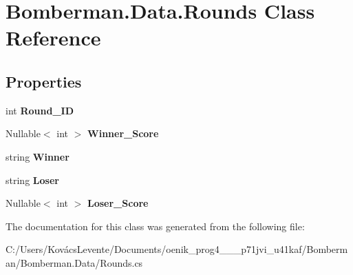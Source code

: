 \hypertarget{class_bomberman_1_1_data_1_1_rounds}{}\section{Bomberman.\+Data.\+Rounds Class Reference}
\label{class_bomberman_1_1_data_1_1_rounds}
\subsection*{Properties}
\begin{DoxyCompactItemize}
\item 
\mbox{\label{class_bomberman_1_1_data_1_1_rounds_a990418ceaf10b99f4545bc3ba2635e8f}} 
int {\bfseries Round\+\_\+\+ID}
\item 
\mbox{\label{class_bomberman_1_1_data_1_1_rounds_ab64c025bd5123a6edc0bb3627b6ed617}} 
Nullable$<$ int $>$ {\bfseries Winner\+\_\+\+Score}
\item 
\mbox{\label{class_bomberman_1_1_data_1_1_rounds_a739e91df747336152218b266f783ac81}} 
string {\bfseries Winner}
\item 
\mbox{\label{class_bomberman_1_1_data_1_1_rounds_a3b839ffc882337532398c3c69f60629a}} 
string {\bfseries Loser}
\item 
\mbox{\label{class_bomberman_1_1_data_1_1_rounds_a66afa885d693016bd78321bd7ce2040d}} 
Nullable$<$ int $>$ {\bfseries Loser\+\_\+\+Score}
\end{DoxyCompactItemize}


The documentation for this class was generated from the following file\+:\begin{DoxyCompactItemize}
\item 
C\+:/\+Users/\+Kovács\+Levente/\+Documents/oenik\+\_\+prog4\+\_\+\_\+\_\+p71jvi\+\_\+u41kaf/\+Bomberman/\+Bomberman.\+Data/Rounds.\+cs\end{DoxyCompactItemize}
